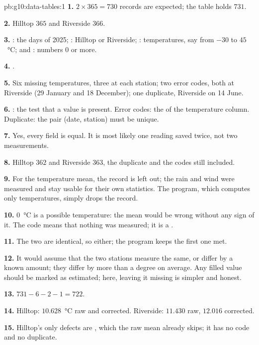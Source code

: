 \begin{solution}{pb:g10:data-tables:1}
\textbf{1.} $2 \times 365 = 730$ records are expected; the table holds $731$.

\textbf{2.} Hilltop $365$ and Riverside $366$.

\textbf{3.} : the days of 2025; : Hilltop or Riverside; : temperatures, say
from $-30$ to $45$~°C;  and : numbers $0$ or more.

\textbf{4.} .

\textbf{5.} Six missing temperatures, three at each station; two error codes, both at Riverside (29 January and
18 December); one duplicate, Riverside on 14 June.

\textbf{6.} : the test that a value is present. Error codes: the  of the temperature column.
Duplicate: the pair (date, station) must be unique.

\textbf{7.} Yes, every field is equal. It is most likely one reading saved twice, not two measurements.

\textbf{8.} Hilltop $362$ and Riverside $363$, the duplicate and the codes still included.

\textbf{9.} For the temperature mean, the record is left out; the rain and wind were measured and stay usable for
their own statistics. The program, which computes only temperatures, simply drops the record.

\textbf{10.} $0$~°C is a possible temperature: the mean would be wrong without any sign of it. The code means that
nothing was measured; it is a .

\textbf{11.} The two are identical, so either; the program keeps the first one met.

\textbf{12.} It would assume that the two stations measure the same, or differ by a known amount; they differ by more
than a degree on average. Any filled value should be marked as estimated; here, leaving it missing is simpler and
honest.

\textbf{13.} $731 - 6 - 2 - 1 = 722$.

\textbf{14.} Hilltop: $10.628$~°C raw and corrected. Riverside: $11.430$ raw, $12.016$ corrected.

\textbf{15.} Hilltop's only defects are , which the raw mean already skips; it has no code and no
duplicate.


\end{solution}
